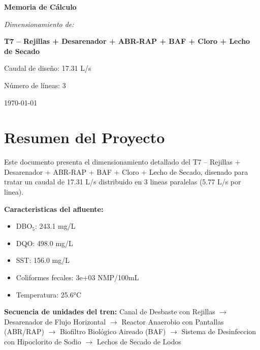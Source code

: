 \documentclass[12pt,a4paper]{article}
\begin{document}
\begin{titlepage}
\centering
\vspace*{2cm}

{\Huge\bfseries Memoria de Cálculo\par}
\vspace{1.5cm}

{\Large\itshape Dimensionamiento de:\par}
\vspace{0.5cm}

{\LARGE\bfseries T7 – Rejillas + Desarenador + ABR-RAP + BAF + Cloro + Lecho de Secado\par}
\vspace{2cm}

{\large Caudal de diseño: 17.31 L/s\par}
{\large Número de líneas: 3\par}
\vfill
{\large\today\par}
\end{titlepage}

\tableofcontents

\listoffigures

\listoftables

\newpage
\section{Resumen del Proyecto}

Este documento presenta el dimensionamiento detallado del T7 – Rejillas + Desarenador + ABR-RAP + BAF + Cloro + Lecho de Secado, disenado para tratar un caudal de 17.31 L/s distribuido en 3 lineas paralelas (5.77 L/s por linea).

\textbf{Caracteristicas del afluente:}
\begin{itemize}
    \item DBO$_5$: 243.1 mg/L
    \item DQO: 498.0 mg/L
    \item SST: 156.0 mg/L
    \item Coliformes fecales: 3e+03 NMP/100mL
    \item Temperatura: 25.6°C
\end{itemize}

\textbf{Secuencia de unidades del tren:} 
Canal de Desbaste con Rejillas $\rightarrow$ Desarenador de Flujo Horizontal $\rightarrow$ Reactor Anaerobio con Pantallas (ABR/RAP) $\rightarrow$ Biofiltro Biológico Aireado (BAF) $\rightarrow$ Sistema de Desinfeccion con Hipoclorito de Sodio $\rightarrow$ Lechos de Secado de Lodos
\end{document}
